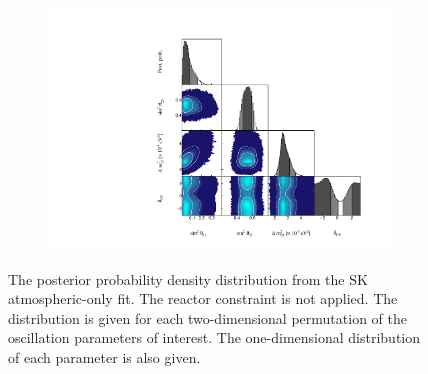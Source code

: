 
\begin{figure}[h]
  \begin{subfigure}[t]{0.98\textwidth}
    \includegraphics[width=\textwidth, trim={0mm 0mm 0mm 0mm}, clip,page=1]{Figures/OA/SKOnlyFit/Contours_1D_woRC_UnSmeared_CredibleInterval_TrianglePlot.pdf}
  \end{subfigure}
  \caption{The posterior probability density distribution from the SK atmospheric-only fit. The reactor constraint is not applied. The distribution is given for each two-dimensional permutation of the oscillation parameters of interest. The one-dimensional distribution of each parameter is also given.}
  \label{fig:OscillationAnalysis_SKOnly_TrianglePlot}
\end{figure}

